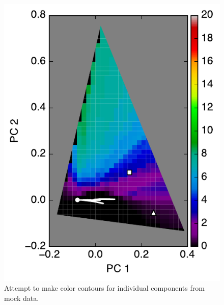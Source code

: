 \documentclass[iop,numberedappendix,apj,]{emulateapj}
\begin{document}
\begin{figure}[tbh!]
\begin{minipage}{0.33\hsize}
\begin{center}
	\includegraphics[width=\hsize]{mockdata_90deg_3types_t360_lc_noreg_2.pdf}
    \end{center}	
   \end{minipage}    
   \caption{Attempt to make color contours for individual components from mock data. }
\label{fig:EPOXI_individual}
\end{figure}
\end{document}
